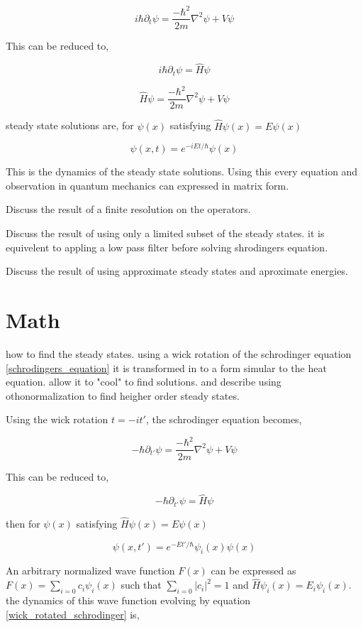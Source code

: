 \documentclass[%
 preprint,
 amsmath, amssymb, aps, pra, 10pt
]{revtex4-2}
\begin{document}
\begin{equation}
i\hbar\partial_{t}\psi = \frac{-\hbar^2}{2m}\nabla^{2}\psi + V\psi
\label{schrodingers_equation}
\end{equation}

This can be reduced to,

\[
i\hbar\partial_{t}\psi = \hat{H}\psi
\]

\[
\hat{H}\psi = \frac{-\hbar^2}{2m}\nabla^{2}\psi + V\psi
\]

steady state solutions are, for $\psi(x)$ satisfying $\hat{H}\psi(x) = E\psi(x)$

\[
\psi(x, t) = e^{-iEt / \hbar}\psi(x)
\]

This is the dynamics of the steady state solutions. Using this every equation and observation in quantum mechanics can expressed in matrix form.

Discuss the result of a finite resolution on the operators.

Discuss the result of using only a limited subset of the steady states. it is equivelent to appling a low pass filter before solving shrodingers equation.

Discuss the result of using approximate steady states and aproximate energies.

\section{Math}
how to find the steady states. using a wick rotation of the schrodinger equation \eqref{schrodingers_equation} it is transformed in to a form simular to the heat equation. allow it to "cool" to find solutions.
and describe using othonormalization to find heigher order steady states.

Using the wick rotation $t = -it'$, the schrodinger equation becomes,

\begin{equation}
-\hbar\partial_{t'}\psi = \frac{-\hbar^2}{2m}\nabla^{2}\psi + V\psi
\label{wick_rotated_schrodinger}
\end{equation}

This can be reduced to,

\[
-\hbar\partial_{t'}\psi = \hat{H}\psi
\]

then for $\psi(x)$ satisfying $\hat{H}\psi(x) = E\psi(x)$

\[
\psi(x, t') = e^{-Et' / \hbar}\psi_i(x)\psi(x)
\]

An arbitrary normalized wave function $F(x)$ can be expressed as $F(x) = \sum_{i=0} c_i \psi_i(x)$ such that $\sum_{i=0} \left| c_i \right|^2 = 1$ and $\hat{H}\psi_i(x) = E_i \psi_i(x)$.  the dynamics of this wave function evolving by equation \eqref{wick_rotated_schrodinger} is,
\end{document}
